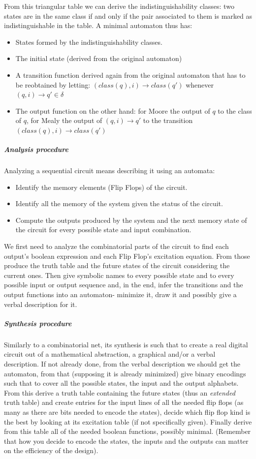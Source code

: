\documentclass{scrartcl}
\begin{document}
    From this triangular table we can derive the indistinguishability classes: two states are in the same class if and only if the pair associated to them is marked as indistinguishable in the table.
    A minimal automaton thus has:
    \begin{itemize}
        \item States formed by the indistinguishability classes.
        \item The initial state (derived from the original automaton)
        \item A transition function derived again from the original automaton that has to be reobtained by letting: $(class(q),i)\to class(q')$ whenever $(q,i)\to q'\in\delta$
        \item The output function on the other hand: for Moore the output of $q$ to the class of $q$, for Mealy the output of $(q,i)\to q'$ to the transition $(class(q),i)\to class(q')$
    \end{itemize}
    \subparagraph{Analysis procedure} Analyzing a sequential circuit means describing it using an automata:
    \begin{itemize}
        \item Identify the memory elements (Flip Flops) of the circuit.
        \item Identify all the memory of the system given the status of the circuit.
        \item Compute the outputs produced by the system and the next memory state of the circuit for every possible state and input combination.
    \end{itemize}
    We first need to analyze the combinatorial parts of the circuit to find each output's boolean expression and each Flip Flop's excitation equation. From those produce the truth table and the future states of the circuit considering the current ones. Then give symbolic names to every possible state and to every possible input or output sequence and, in the end, infer the transitions and the output functions into an automaton- minimize it, draw it and possibly give a verbal description for it.
    \subparagraph{Synthesis procedure} Similarly to a combinatorial net, its synthesis is such that to create a real digital circuit out of a mathematical abstraction, a graphical and/or a verbal description. If not already done, from the verbal description we should get the automaton, from that (supposing it is already minimized) give binary encodings such that to cover all the possible states, the input and the output alphabets. From this derive a truth table containing the future states (thus an \emph{extended} truth table) and create entries for the input lines of all the needed flip flops (as many as there are bits needed to encode the states), decide which flip flop kind is the best by looking at its excitation table (if not specifically given). Finally derive from this table all of the needed boolean functions, possibly minimal. (Remember that how you decide to encode the states, the inputs and the outputs can matter on the efficiency of the design).
\end{document}
